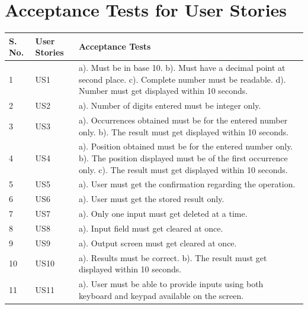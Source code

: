 \documentclass[paper=a4, fontsize=11pt]{report}
\numberwithin{equation}{section}		%
\numberwithin{figure}{section}			%
\numberwithin{table}{section}				%
\begin{document}
\section{Acceptance Tests for User Stories }

\begin{center}
\begin{tabular}{| m{1.3cm} |  m{1.2cm} | m{35em} |} 
\hline
S. No. & User Stories & Acceptance Tests \\ [0.7ex]
\hline\hline
1 & US1 & a). Must be in base 10.\newline
b). Must have a decimal point at second place.\newline
c). Complete number must be readable.\newline
d). Number must get displayed within 10 seconds. \\ 
\hline
2 & US2 & a). Number of digits entered must be integer only. \\ 
\hline
3 & US3 & a). Occurrences obtained must be for the entered number only.\newline
b). The result must get displayed within 10 seconds. \\ 
\hline
4 & US4 & a). Position obtained must be for the entered number only.\newline
b). The position displayed must be of the first occurrence only.\newline
c). The result must get displayed within 10 seconds.  \\ 
\hline
5 & US5 & a). User must get the confirmation regarding the operation. \\ 
\hline
6 & US6 & a). User must get the stored result only. \\ 
\hline
7 & US7 & a). Only one input must get deleted at a time. \\ 
\hline
8 & US8 & a). Input field must get cleared at once. \\ 
\hline
9 & US9 & a). Output screen must get cleared at once. \\ 
\hline
10 & US10 & a). Results must be correct.\newline
b). The result must get displayed within 10 seconds.  \\ 
\hline
11 & US11 & a). User must be able to provide inputs using both keyboard and keypad available on the screen.   \\ 
\hline
\end{tabular}
\end{center}

\end{document}
